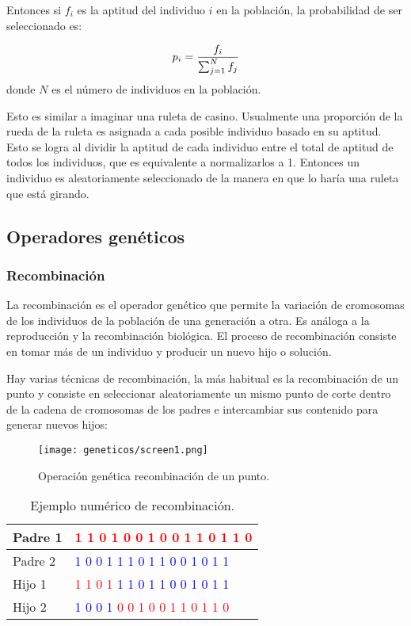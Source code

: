 Entonces si \(f_i\)  es la aptitud del individuo \(i\) en la población, la probabilidad de ser seleccionado es:\par
\[p_i = {f_i \over \sum_{j=1}^{N} f_j}\]
donde \(N\) es el número de individuos en la población.\par

Esto es similar a imaginar una ruleta de casino. Usualmente una proporción de la rueda de la ruleta es asignada a cada posible individuo basado en su aptitud. Esto se logra al dividir la aptitud de cada individuo entre el total de aptitud de todos los individuos, que es equivalente a normalizarlos a 1. Entonces un individuo es aleatoriamente seleccionado de la manera en que lo haría una ruleta que está girando.

\subsection{Operadores gen\'eticos}

\subsubsection{Recombinaci\'on}

La recombinación es el operador genético que permite la variación de cromosomas de los individuos de la población de una generación a otra. Es análoga a la reproducción y la recombinación biológica. El proceso de recombinación consiste en tomar más de un individuo y producir un nuevo hijo o solución.\par

Hay varias técnicas de recombinación, la más habitual es la recombinación de un punto y consiste en seleccionar aleatoriamente un mismo punto de corte dentro de la cadena de cromosomas de los padres e intercambiar sus contenido para generar nuevos hijos:

\begin{figure}[H]
  \centering
  \texttt{[image: geneticos/screen1.png]}
  \caption{Operación genética recombinación de un punto.}
\end{figure}

\begin{table}[H]
  \centering
  \begin{tabular}{|l|l|}
  \hline
  Padre 1 & \textcolor{red}{1 1 0 1 0 0 1 0 0 1 1 0 1 1 0}                    \\ \hline
  Padre 2 & \textcolor{blue}{1 0 0 1 1 1 0 1 1 0 0 1 0 1 1}                   \\ \hline
  Hijo 1  & \textcolor{red}{1 1 0 1} \textcolor{blue}{ 1 1 0 1 1 0 0 1 0 1 1} \\ \hline
  Hijo 2  & \textcolor{blue}{1 0 0 1} \textcolor{red}{0 0 1 0 0 1 1 0 1 1 0}  \\ \hline
  \end{tabular}
  \caption{Ejemplo numérico de recombinación.}
\end{table}

